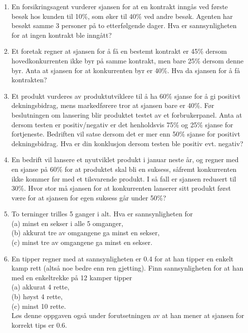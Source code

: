 \begin{enumerate}
\item En forsikringsagent vurderer sjansen for at en kontrakt inngås ved
      første besøk hos kunden til 10\%, som øker til 40\% ved andre
      besøk. Agenten har besøkt samme 3 personer på to
      etterfølgende dager. Hva er sannsynligheten for at ingen kontrakt ble
      inngått?

\item Et foretak regner at sjansen for å få en bestemt kontrakt er 45\%
      dersom hovedkonkurrenten ikke byr på samme kontrakt, men bare 25\%
      dersom denne byr. Anta at sjansen for at konkurrenten byr er 40\%.
      Hva da sjansen for å få kontrakten?

\item Et produkt vurderes av produktutviklere til å ha 60\% sjanse for
      å gi positivt dekningsbidrag, mens markedførere tror at sjansen 
      bare er 40\%. Før beslutningen om lansering blir produktet testet av
      et forbrukerpanel. Anta at dersom testen er positiv/negativ er det
      henholdsvis 75\% og 25\% sjanse for fortjeneste. Bedriften vil satse
      dersom det er mer enn 50\% sjanse for positivt dekningsbidrag.
      Hva er din konklusjon dersom testen ble positiv evt. negativ?

\item En bedrift vil lansere et nyutviklet produkt i januar neste år, og
      regner med en sjanse på 60\% for at produktet skal bli en suksess,
      såfremt konkurrenten ikke kommer før med et tilsvarende produkt.
      I så fall er sjansen redusert til 30\%. Hvor stor må sjansen for
      at konkurrenten lanserer sitt produkt først være for at sjansen
      for egen suksess går under 50\%?

\item  To terninger trilles 5 ganger i alt. Hva er sannsynligheten for\\
     (a)  minst en sekser i alle 5 omganger,\\
     (b)  akkurat tre av omgangene ga minst en sekser,\\
     (c)  minst tre av omgangene ga minst en sekser.

\item En tipper regner med at sannsynligheten er 0.4 for at han
     tipper en enkelt kamp rett (altså noe bedre enn ren
     gjetting). Finn sannsynligheten for at han med en
     enkeltrekke på 12 kamper tipper\\
     (a)  akkurat 4 rette,\\
     (b)  høyst 4 rette,\\
     (c)  minst 10 rette.\\
     Løs denne oppgaven også under forutsetningen av at han mener
     at sjansen for korrekt tips er 0.6.


\end{enumerate}
